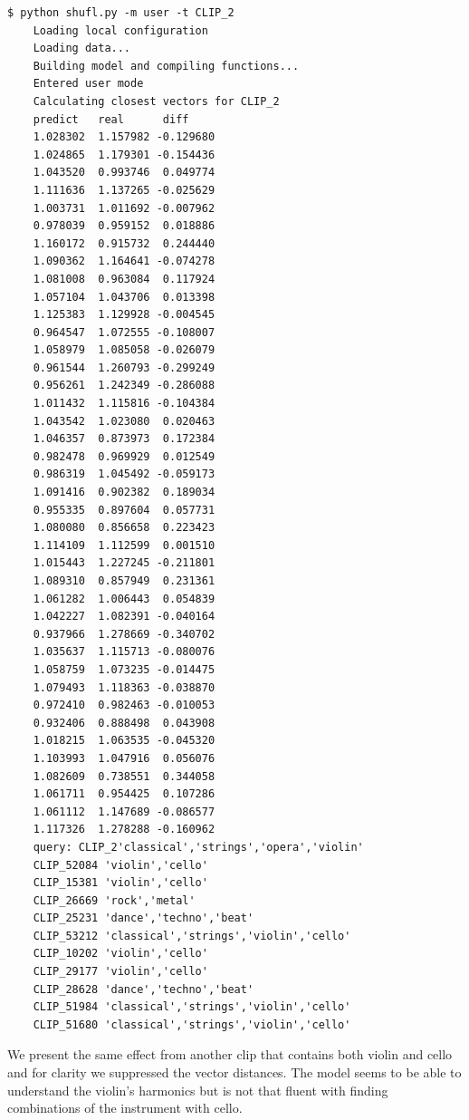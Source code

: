 \documentclass[11pt, a4paper]{article}
\begin{document}
    \begin{Verbatim}[xleftmargin=.5in]
    $ python shufl.py -m user -t CLIP_2
    Loading local configuration
    Loading data...
    Building model and compiling functions...
    Entered user mode
    Calculating closest vectors for CLIP_2
    predict   real      diff
    1.028302  1.157982 -0.129680
    1.024865  1.179301 -0.154436
    1.043520  0.993746  0.049774
    1.111636  1.137265 -0.025629
    1.003731  1.011692 -0.007962
    0.978039  0.959152  0.018886
    1.160172  0.915732  0.244440
    1.090362  1.164641 -0.074278
    1.081008  0.963084  0.117924
    1.057104  1.043706  0.013398
    1.125383  1.129928 -0.004545
    0.964547  1.072555 -0.108007
    1.058979  1.085058 -0.026079
    0.961544  1.260793 -0.299249
    0.956261  1.242349 -0.286088
    1.011432  1.115816 -0.104384
    1.043542  1.023080  0.020463
    1.046357  0.873973  0.172384
    0.982478  0.969929  0.012549
    0.986319  1.045492 -0.059173
    1.091416  0.902382  0.189034
    0.955335  0.897604  0.057731
    1.080080  0.856658  0.223423
    1.114109  1.112599  0.001510
    1.015443  1.227245 -0.211801
    1.089310  0.857949  0.231361
    1.061282  1.006443  0.054839
    1.042227  1.082391 -0.040164
    0.937966  1.278669 -0.340702
    1.035637  1.115713 -0.080076
    1.058759  1.073235 -0.014475
    1.079493  1.118363 -0.038870
    0.972410  0.982463 -0.010053
    0.932406  0.888498  0.043908
    1.018215  1.063535 -0.045320
    1.103993  1.047916  0.056076
    1.082609  0.738551  0.344058
    1.061711  0.954425  0.107286
    1.061112  1.147689 -0.086577
    1.117326  1.278288 -0.160962
    query: CLIP_2'classical','strings','opera','violin'
    CLIP_52084 'violin','cello'
    CLIP_15381 'violin','cello'
    CLIP_26669 'rock','metal'
    CLIP_25231 'dance','techno','beat'
    CLIP_53212 'classical','strings','violin','cello'
    CLIP_10202 'violin','cello'
    CLIP_29177 'violin','cello'
    CLIP_28628 'dance','techno','beat'
    CLIP_51984 'classical','strings','violin','cello'
    CLIP_51680 'classical','strings','violin','cello'
    \end{Verbatim}

    \noindent
    We present the same effect from another clip that contains both violin and
    cello and for clarity we suppressed the vector distances. The model seems to
    be able to understand the violin's harmonics but is not that fluent with
    finding combinations of the instrument with cello.
    \\ \\
\end{document}
